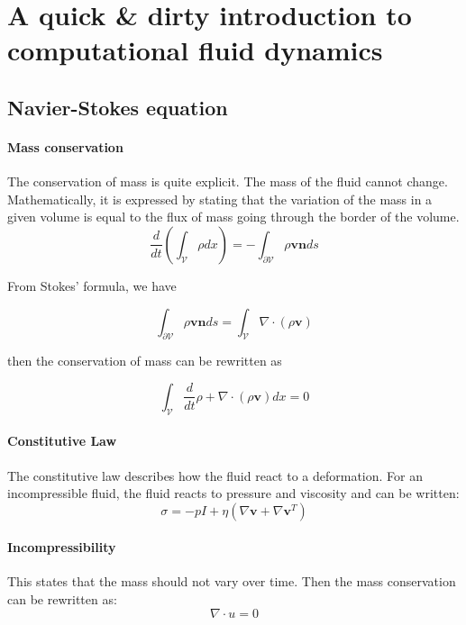 \documentclass[11pt, oneside, a4paper]{memoir}
\begin{document}
\section[A quick \& dirty introduction to fluid dynamics]{A quick \& dirty introduction to computational fluid dynamics}

\subsection{Navier-Stokes equation}

\paragraph{Mass conservation}
The conservation of mass is quite explicit. The mass of the fluid cannot change. Mathematically, it is expressed by stating that the variation of the mass in a given volume is equal to the flux of mass going through the border of the volume.
\begin{equation}
    \label{eq:massConservation}
    \frac{d}{dt}\left( \int_{\mathcal{V}} \rho dx \right)
    =
    - \int_{\mathcal{\partial V}}\rho \mathbf{v} \mathbf{n} ds
\end{equation}

From Stokes' formula, we have

\begin{equation}
\int_{\partial \mathcal{V}} \rho \mathbf{v} \mathbf{n} ds =
\int_{\mathcal{V}} \nabla \cdot \left( \rho \mathbf{v} \right)
\end{equation}

then the conservation of mass can be rewritten as

\begin{equation}
\int_{\mathcal{V}} \frac{d}{dt} \rho + \nabla \cdot \left( \rho  \mathbf{v} \right) dx = 0
\end{equation}

\paragraph{Constitutive Law}
The constitutive law describes how the fluid react to a deformation. For an incompressible fluid, the fluid reacts to pressure and viscosity and can be written:
\begin{equation}
\sigma = -pI + \eta \left( \nabla \mathbf{v} + \nabla \mathbf{v}^{T} \right)
\end{equation}

\paragraph{Incompressibility}
This states that the mass should not vary over time. Then the mass conservation can be rewritten as:
\begin{equation}
\nabla \cdot u = 0
\end{equation}
\end{document}
